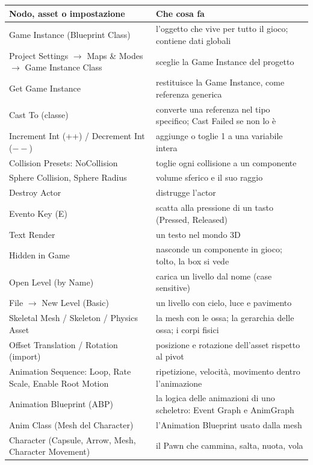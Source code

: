 \begin{table}[htbp]
\centering
\small
\begin{tabular}{@{}p{4.6cm}p{9.4cm}@{}}
\toprule
\textbf{Nodo, asset o impostazione} & \textbf{Che cosa fa} \\
\midrule
Game Instance (Blueprint Class) & l'oggetto che vive per tutto il gioco; contiene dati
globali \\
Project Settings $\rightarrow$ Maps \& Modes $\rightarrow$ Game Instance Class & sceglie
la Game Instance del progetto \\
Get Game Instance & restituisce la Game Instance, come referenza generica \\
Cast To (classe) & converte una referenza nel tipo specifico; Cast Failed se non lo è \\
Increment Int (++) / Decrement Int ($--$) & aggiunge o toglie 1 a una variabile intera \\
Collision Presets: NoCollision & toglie ogni collisione a un componente \\
Sphere Collision, Sphere Radius & volume sferico e il suo raggio \\
Destroy Actor & distrugge l'actor \\
Evento Key (E) & scatta alla pressione di un tasto (Pressed, Released) \\
Text Render & un testo nel mondo 3D \\
Hidden in Game & nasconde un componente in gioco; tolto, la box si vede \\
Open Level (by Name) & carica un livello dal nome (case sensitive) \\
File $\rightarrow$ New Level (Basic) & un livello con cielo, luce e pavimento \\
Skeletal Mesh / Skeleton / Physics Asset & la mesh con le ossa; la gerarchia delle ossa;
i corpi fisici \\
Offset Translation / Rotation (import) & posizione e rotazione dell'asset rispetto al
pivot \\
Animation Sequence: Loop, Rate Scale, Enable Root Motion & ripetizione, velocità,
movimento dentro l'animazione \\
Animation Blueprint (ABP) & la logica delle animazioni di uno scheletro: Event Graph e
AnimGraph \\
Anim Class (Mesh del Character) & l'Animation Blueprint usato dalla mesh \\
Character (Capsule, Arrow, Mesh, Character Movement) & il Pawn che cammina, salta,
nuota, vola \\

\end{tabular}
\end{table}
